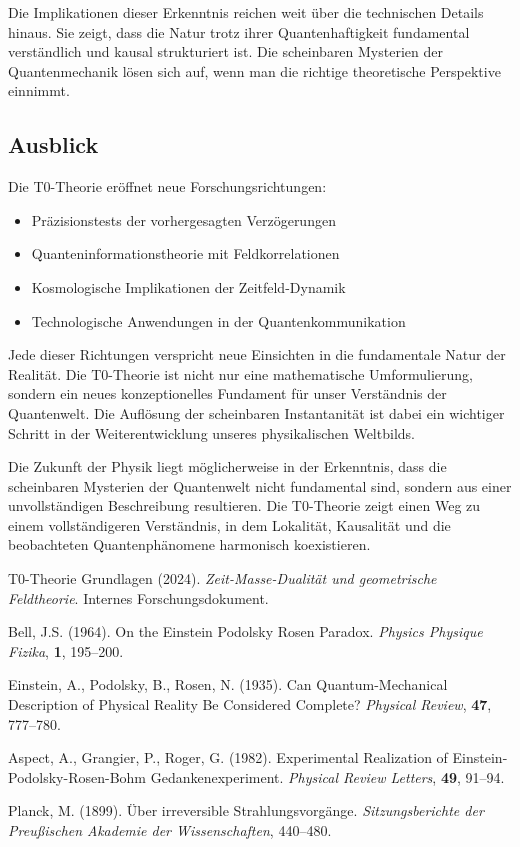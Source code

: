 \documentclass[12pt,a4paper]{article}
\begin{document}
	Die Implikationen dieser Erkenntnis reichen weit über die technischen Details hinaus. Sie zeigt, dass die Natur trotz ihrer Quantenhaftigkeit fundamental verständlich und kausal strukturiert ist. Die scheinbaren Mysterien der Quantenmechanik lösen sich auf, wenn man die richtige theoretische Perspektive einnimmt.
	
	\subsection{Ausblick}
	
	Die T0-Theorie eröffnet neue Forschungsrichtungen:
	\begin{itemize}
		\item Präzisionstests der vorhergesagten Verzögerungen
		\item Quanteninformationstheorie mit Feldkorrelationen
		\item Kosmologische Implikationen der Zeitfeld-Dynamik
		\item Technologische Anwendungen in der Quantenkommunikation
	\end{itemize}
	
	Jede dieser Richtungen verspricht neue Einsichten in die fundamentale Natur der Realität. Die T0-Theorie ist nicht nur eine mathematische Umformulierung, sondern ein neues konzeptionelles Fundament für unser Verständnis der Quantenwelt. Die Auflösung der scheinbaren Instantanität ist dabei ein wichtiger Schritt in der Weiterentwicklung unseres physikalischen Weltbilds.
	
	Die Zukunft der Physik liegt möglicherweise in der Erkenntnis, dass die scheinbaren Mysterien der Quantenwelt nicht fundamental sind, sondern aus einer unvollständigen Beschreibung resultieren. Die T0-Theorie zeigt einen Weg zu einem vollständigeren Verständnis, in dem Lokalität, Kausalität und die beobachteten Quantenphänomene harmonisch koexistieren.
	
	\begin{thebibliography}{99}
		T0-Theorie Grundlagen (2024). \textit{Zeit-Masse-Dualität und geometrische Feldtheorie}. Internes Forschungsdokument.
		
		Bell, J.S. (1964). On the Einstein Podolsky Rosen Paradox. \textit{Physics Physique Fizika}, \textbf{1}, 195--200.
		
		Einstein, A., Podolsky, B., Rosen, N. (1935). Can Quantum-Mechanical Description of Physical Reality Be Considered Complete? \textit{Physical Review}, \textbf{47}, 777--780.
		
		Aspect, A., Grangier, P., Roger, G. (1982). Experimental Realization of Einstein-Podolsky-Rosen-Bohm Gedankenexperiment. \textit{Physical Review Letters}, \textbf{49}, 91--94.
		
		Planck, M. (1899). Über irreversible Strahlungsvorgänge. \textit{Sitzungsberichte der Preußischen Akademie der Wissenschaften}, 440--480.
	\end{thebibliography}
	
\end{document}
